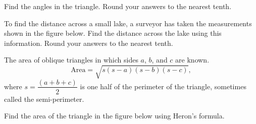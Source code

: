 \begin{example}
   Find the angles in the triangle. Round your answers to the nearest tenth.\\
\end{example}

\newpage

\begin{example}
  To find the distance across a small lake, a surveyor has taken the measurements shown in the figure below. Find the distance across the lake using this information. Round your answers to the nearest tenth.\\
\end{example}

\begin{theorem}
The area of oblique triangles in which sides $a$, $b$, and $c$ are known.
\[\text{Area}=\sqrt{s(s-a)(s-b)(s-c)},\]
where $s=\dfrac{(a+b+c)}{2}$ is one half of the perimeter of the triangle, sometimes called the semi-perimeter.
\end{theorem}

\begin{example}
  Find the area of the triangle in the figure below using Heron's formula.\\
\end{example}
\vspace*{-0.1\textheight}

